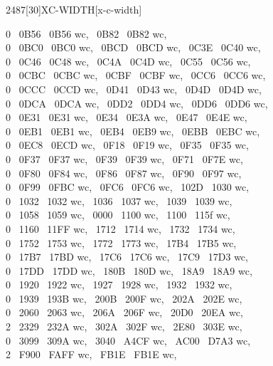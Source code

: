 \begin{worddef}{2487}[30]{XC-WIDTH}[x-c-width]
\begin{implement}
	0 ~0B56 ~0B56 wc, ~0B82 ~0B82 wc,\\
	0 ~0BC0 ~0BC0 wc, ~0BCD ~0BCD wc, ~0C3E ~0C40 wc,\\
	0 ~0C46 ~0C48 wc, ~0C4A ~0C4D wc, ~0C55 ~0C56 wc,\\
	0 ~0CBC ~0CBC wc, ~0CBF ~0CBF wc, ~0CC6 ~0CC6 wc,\\
	0 ~0CCC ~0CCD wc, ~0D41 ~0D43 wc, ~0D4D ~0D4D wc,\\
	0 ~0DCA ~0DCA wc, ~0DD2 ~0DD4 wc, ~0DD6 ~0DD6 wc,\\
	0 ~0E31 ~0E31 wc, ~0E34 ~0E3A wc, ~0E47 ~0E4E wc,\\
	0 ~0EB1 ~0EB1 wc, ~0EB4 ~0EB9 wc, ~0EBB ~0EBC wc,\\
	0 ~0EC8 ~0ECD wc, ~0F18 ~0F19 wc, ~0F35 ~0F35 wc,\\
	0 ~0F37 ~0F37 wc, ~0F39 ~0F39 wc, ~0F71 ~0F7E wc,\\
	0 ~0F80 ~0F84 wc, ~0F86 ~0F87 wc, ~0F90 ~0F97 wc,\\
	0 ~0F99 ~0FBC wc, ~0FC6 ~0FC6 wc, ~102D ~1030 wc,\\
	0 ~1032 ~1032 wc, ~1036 ~1037 wc, ~1039 ~1039 wc,\\
	0 ~1058 ~1059 wc, ~0000 ~1100 wc, ~1100 ~115f wc,\\
	0 ~1160 ~11FF wc, ~1712 ~1714 wc, ~1732 ~1734 wc,\\
	0 ~1752 ~1753 wc, ~1772 ~1773 wc, ~17B4 ~17B5 wc,\\
	0 ~17B7 ~17BD wc, ~17C6 ~17C6 wc, ~17C9 ~17D3 wc,\\
	0 ~17DD ~17DD wc, ~180B ~180D wc, ~18A9 ~18A9 wc,\\
	0 ~1920 ~1922 wc, ~1927 ~1928 wc, ~1932 ~1932 wc,\\
	0 ~1939 ~193B wc, ~200B ~200F wc, ~202A ~202E wc,\\
	0 ~2060 ~2063 wc, ~206A ~206F wc, ~20D0 ~20EA wc,\\
	2 ~2329 ~232A wc, ~302A ~302F wc, ~2E80 ~303E wc,\\
	0 ~3099 ~309A wc, ~3040 ~A4CF wc, ~AC00 ~D7A3 wc,\\
	2 ~F900 ~FAFF wc, ~FB1E ~FB1E wc,\tab[2]

\end{implement}
\end{worddef}
